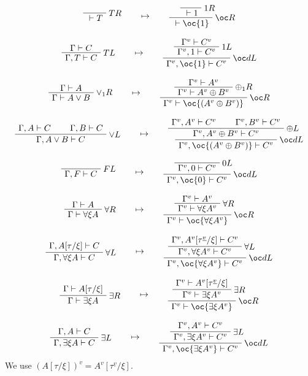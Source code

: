 \begin{gather*}
\LabelRule{T R}
\NulRule{{}\vdash T}
\DisplayProof
\qquad\mapsto\qquad
\LabelRule{\one R}
\NulRule{{}\vdash \one}
\LabelRule{\oc R}
\UnaRule{{}\vdash \oc{\one}}
\DisplayProof
\\[2ex]
\AxRule{\Gamma\vdash C}
\LabelRule{T L}
\UnaRule{\Gamma,T\vdash C}
\DisplayProof
\qquad\mapsto\qquad
\AxRule{\Gamma^v\vdash C^v}
\LabelRule{\one L}
\UnaRule{\Gamma^v,\one\vdash C^v}
\LabelRule{\oc d L}
\UnaRule{\Gamma^v,\oc{\one}\vdash C^v}
\DisplayProof
\\[2ex]
\AxRule{\Gamma\vdash A}
\LabelRule{\vee_1 R}
\UnaRule{\Gamma\vdash A\vee B}
\DisplayProof
\qquad\mapsto\qquad
\AxRule{\Gamma^v\vdash A^v}
\LabelRule{\plus_1 R}
\UnaRule{\Gamma^v\vdash A^v\plus B^v}
\LabelRule{\oc R}
\UnaRule{\Gamma^v\vdash \oc{(A^v\plus B^v)}}
\DisplayProof
\\[2ex]
\AxRule{\Gamma,A\vdash C}
\AxRule{\Gamma,B\vdash C}
\LabelRule{\vee L}
\BinRule{\Gamma,A\vee B\vdash C}
\DisplayProof
\qquad\mapsto\qquad
\AxRule{\Gamma^v,A^v\vdash C^v}
\AxRule{\Gamma^v,B^v\vdash C^v}
\LabelRule{\plus L}
\BinRule{\Gamma^v,A^v\plus B^v\vdash C^v}
\LabelRule{\oc d L}
\UnaRule{\Gamma^v,\oc{(A^v\plus B^v)}\vdash C^v}
\DisplayProof
\\[2ex]
\LabelRule{F L}
\NulRule{\Gamma,F\vdash C}
\DisplayProof
\qquad\mapsto\qquad
\LabelRule{\zero L}
\NulRule{\Gamma^v,\zero\vdash C^v}
\LabelRule{\oc d L}
\UnaRule{\Gamma^v,\oc{\zero}\vdash C^v}
\DisplayProof
\\[2ex]
\AxRule{\Gamma\vdash A}
\LabelRule{\forall R}
\UnaRule{\Gamma\vdash \forall\xi A}
\DisplayProof
\qquad\mapsto\qquad
\AxRule{\Gamma^v\vdash A^v}
\LabelRule{\forall R}
\UnaRule{\Gamma^v\vdash \forall\xi A^v}
\LabelRule{\oc R}
\UnaRule{\Gamma^v\vdash \oc{\forall\xi A^v}}
\DisplayProof
\\[2ex]
\AxRule{\Gamma,A[\tau/\xi]\vdash C}
\LabelRule{\forall L}
\UnaRule{\Gamma,\forall\xi A\vdash C}
\DisplayProof
\qquad\mapsto\qquad
\AxRule{\Gamma^v,A^v[\tau^{\underline{v}}/\xi]\vdash C^v}
\LabelRule{\forall L}
\UnaRule{\Gamma^v,\forall\xi A^v\vdash C^v}
\LabelRule{\oc d L}
\UnaRule{\Gamma^v,\oc{\forall\xi A^v}\vdash C^v}
\DisplayProof
\\[2ex]
\AxRule{\Gamma\vdash A[\tau/\xi]}
\LabelRule{\exists R}
\UnaRule{\Gamma\vdash \exists\xi A}
\DisplayProof
\qquad\mapsto\qquad
\AxRule{\Gamma^v\vdash A^v[\tau^{\underline{v}}/\xi]}
\LabelRule{\exists R}
\UnaRule{\Gamma^v\vdash \exists\xi A^v}
\LabelRule{\oc R}
\UnaRule{\Gamma^v\vdash \oc{\exists\xi A^v}}
\DisplayProof
\\[2ex]
\AxRule{\Gamma,A\vdash C}
\LabelRule{\exists L}
\UnaRule{\Gamma,\exists\xi A\vdash C}
\DisplayProof
\qquad\mapsto\qquad
\AxRule{\Gamma^v,A^v\vdash C^v}
\LabelRule{\exists L}
\UnaRule{\Gamma^v,\exists\xi A^v\vdash C^v}
\LabelRule{\oc d L}
\UnaRule{\Gamma^v,\oc{\exists\xi A^v}\vdash C^v}
\DisplayProof
\end{gather*}
We use \((A[\tau/\xi])^v=A^v[\tau^{\underline{v}}/\xi]\).

